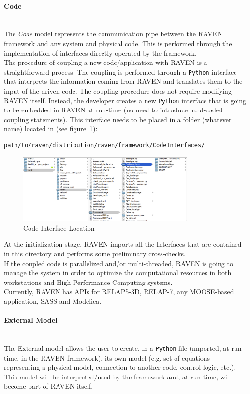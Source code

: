 \paragraph{Code} ~\\ 
The \textit{Code} model represents the communication pipe between the RAVEN framework and any system and physical code. This is performed through the implementation of interfaces directly operated by the framework. 
\\The procedure of coupling a new code/application with RAVEN is a straightforward process. The coupling is performed through a \texttt{Python}  interface that interprets the information coming from RAVEN and translates them to the input of the driven code. The coupling procedure does not require modifying RAVEN itself. Instead, the developer creates a new \texttt{Python} interface that is going to be embedded in RAVEN at run-time (no need to introduce hard-coded coupling statements).  This interface needs to be placed in a folder (whatever name) located in (see figure~\ref{fig:CodeInterfaceLocation}):
\begin{lstlisting}[language=bash]
 path/to/raven/distribution/raven/framework/CodeInterfaces/
\end{lstlisting}

\begin{figure}
  \centering
  \includegraphics[width=0.8\textwidth]  {pics/CodeInterfaceLocation.png}
  \caption{Code Interface Location}
  \label{fig:CodeInterfaceLocation}
\end{figure}
At the initialization stage, RAVEN imports all the Interfaces that are contained in this directory and performs some preliminary cross-checks. 
\\ If the coupled code is parallelized and/or multi-threaded, RAVEN is going to manage the system in order to optimize the computational resources in both workstations and High Performance Computing systems.
\\Currently, RAVEN has APIs for RELAP5-3D, RELAP-7, any MOOSE-based application, SASS and Modelica.
\paragraph{External Model} ~\\
The External model allows the user to create, in a \texttt{Python} file (imported, at run-time, in the RAVEN framework), its own model (e.g. set of equations representing a physical model, connection to another code, control logic, etc.). This model will be interpreted/used by the framework and, at run-time, will become part of RAVEN itself.
